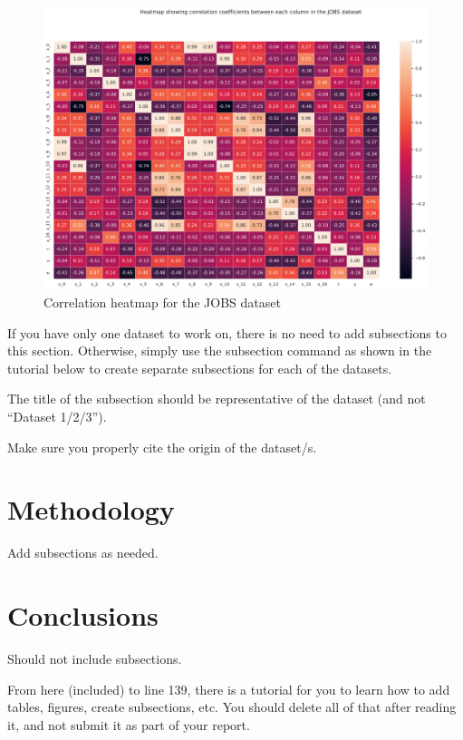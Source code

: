 \documentclass{article}
\begin{document}
\begin{figure}[tb]
\centering
\includegraphics[width=1\textwidth]{project/data/jobs_heatmap.pdf}
\caption{\label{fig:jobs_correlation}Correlation heatmap for the JOBS dataset}
\end{figure}



If you have only one dataset to work on, there is no need to add subsections to this section.
Otherwise, simply use the subsection command as shown in the tutorial below to create
separate subsections for each of the datasets.

The title of the subsection should be representative of the dataset (and not ``Dataset 1/2/3'').

Make sure you properly cite the origin of the dataset/s.

\section{Methodology}

Add subsections as needed.

\section{Conclusions}

Should not include subsections.

From here (included) to line 139, there is a tutorial for you to learn how to add tables,
figures, create subsections, etc.
You should delete all of that after reading it, and not submit it as part of your report.
\end{document}
